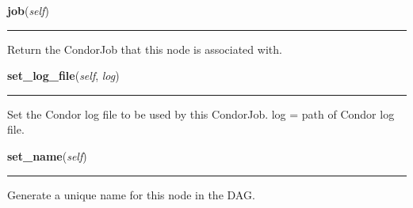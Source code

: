     \label{pipeline:CondorDAGNode:job}
    \vspace{0.5ex}

    \noindent\begin{boxedminipage}{\textwidth}

    \raggedright \textbf{job}(\textit{self})

    \vspace{-1.5ex}

    \rule{\textwidth}{0.5\fboxrule}
    Return the CondorJob that this node is associated with.

    \vspace{1ex}

    \end{boxedminipage}

    \label{pipeline:CondorDAGNode:set_log_file}
    \vspace{0.5ex}

    \noindent\begin{boxedminipage}{\textwidth}

    \raggedright \textbf{set\_log\_file}(\textit{self}, \textit{log})

    \vspace{-1.5ex}

    \rule{\textwidth}{0.5\fboxrule}
    Set the Condor log file to be used by this CondorJob. log = path of 
    Condor log file.

    \vspace{1ex}

    \end{boxedminipage}

    \label{pipeline:CondorDAGNode:set_name}
    \vspace{0.5ex}

    \noindent\begin{boxedminipage}{\textwidth}

    \raggedright \textbf{set\_name}(\textit{self})

    \vspace{-1.5ex}

    \rule{\textwidth}{0.5\fboxrule}
    Generate a unique name for this node in the DAG.

    \vspace{1ex}

    \end{boxedminipage}

